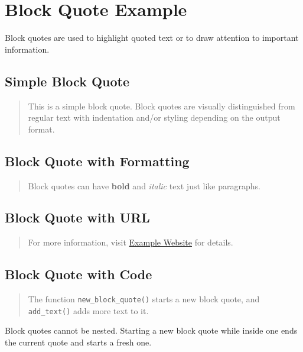 \documentclass[a4paper]{report}
\begin{document}
\chapter{Block Quote Example}

Block quotes are used to highlight quoted text or to draw attention to important information.

\section{Simple Block Quote}

\begin{quote}
This is a simple block quote. Block quotes are visually distinguished from regular text with indentation and/or styling depending on the output format.
\end{quote}

\section{Block Quote with Formatting}

\begin{quote}
Block quotes can have\textbf{ bold} and\textit{ italic} text just like paragraphs.
\end{quote}

\section{Block Quote with URL}

\begin{quote}
For more information, visit \href{http://example.com}{Example Website} for details.
\end{quote}

\section{Block Quote with Code}

\begin{quote}
The function \texttt{new\_block\_quote()} starts a new block quote, and \texttt{add\_text()} adds more text to it.
\end{quote}

Block quotes cannot be nested. Starting a new block quote while inside one ends the current quote and starts a fresh one.
\end{document}
